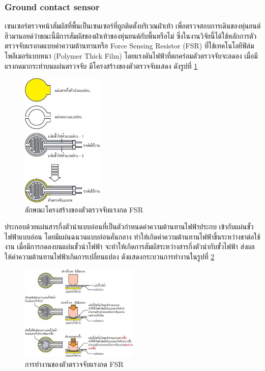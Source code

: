 {\clearpage
\subsubsection*{Ground contact sensor}
เซนเซอร์ตรวจหน้าสัมผัสที่พื้นเป็นเซนเซอร์ที่ถูกติดตั้งบริเวณฝ่าเท้า เพื่อตรวจสอบการเดินของหุ่นยนต์ฮิวมานอยด์ว่าขณะนี้มีการสัมผัสของฝ่าเท้าของหุ่นยนต์กับพื้นหรือไม่ 
ซึ่งในงานวิจัยนี้ได้ใช้หลักการตัวตรวจจับแรงกดแบบค่าความต้านทานหรือ Force Sensing Resistor (FSR) ที่ใช้เทคโนโลยีฟิล์มโพลีเมอร์แบบหนา (Polymer Thick Film) 
โดยแรงดันไฟฟ้าที่ตกคร่อมตัวตรวจจับจะลดลง เมื่อมีแรงกดมากระทำบนแผ่นตรวจจับ มีโครงสร้างของตัวตรวจจับแสดง ดังรูปที่ \ref{fig:FSRarchitec}
\begin{figure}[!ht]
    \centering
    \includegraphics[width=0.35\textwidth]{chapter3/images/FSRarchitec.jpg}
    \caption{ลักษณะโครงสร้างของตัวตรวจจับแรงกด FSR}
    \label{fig:FSRarchitec}
\end{figure}

ประกอบด้วยแผ่นสารกึ่งตัวนำแบบอ่อนที่เป็นตัวกำหนดค่าความต้านทานไฟฟ้าประกบ เข้ากับแผ่นขั้วไฟฟ้าแบบอ่อน โดยมีแผ่นฉนวนแบบอ่อนคั่นกลาง 
ทำให้เกิดค่าความต้านทานไฟฟ้าขึ้นระหว่างขาต่อใช้งาน เมื่อมีการกดลงบนแผ่นขั้วนำไฟฟ้า จะทำให้เกิดการสัมผัสระหว่างสารกึ่งตัวนำกับขั้วไฟฟ้า
ส่งผลให้ค่าความต้านทานไฟฟ้าเกิดการเปลี่ยนแปลง ดังแสดงกระบวนการทำงานในรูปที่ \ref{fig:FSRfunction}
\begin{figure}[!ht]
    \centering
    \includegraphics[width=0.5\textwidth]{chapter3/images/FSRfunction.jpg}
    \caption{การทำงานของตัวตรวจจับแรงกด FSR}
    \label{fig:FSRfunction}
\end{figure}

}
